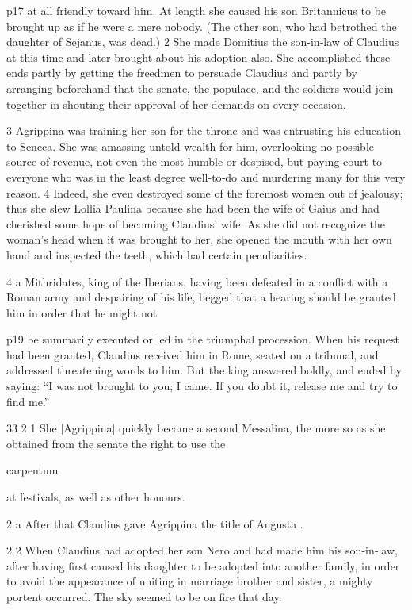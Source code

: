 p17 at all friendly toward him. At length she caused his son Britannicus to be brought up as if he were a mere nobody. (The other son, who had betrothed the daughter of Sejanus, was dead.) 2 She made Domitius the son-in\texthebrew{‑}law of Claudius at this time and later brought about his adoption also. She accomplished these ends partly by getting the freedmen to persuade Claudius and partly by arranging beforehand that the senate, the populace, and the soldiers would join together in shouting their approval of her demands on every occasion.

3
Agrippina was training her son for the throne and was entrusting his education to Seneca. She was amassing untold wealth for him, over­looking no possible source of revenue, not even the most humble or despised, but paying court to everyone who was in the least degree well-to\texthebrew{‑}do and murdering many for this very reason. 4 Indeed, she even destroyed some of the foremost women out of jealousy; thus she slew Lollia Paulina because she had been the wife of Gaius and had cherished some hope of becoming Claudius' wife. As she did not recognize the woman's head when it was brought to her, she opened the mouth with her own hand and inspected the teeth, which had certain peculiarities.

4 a
Mithridates, king of the Iberians, having been defeated in a conflict with a Roman army and despairing of his life, begged that a hearing should be granted him in order that he might not

p19 be summarily executed or led in the triumphal procession. When his request had been granted, Claudius received him in Rome, seated on a tribunal, and addressed threatening words to him. But the king answered boldly, and ended by saying: ``I was not brought to you; I came. If you doubt it, release me and try to find me.''

33
2 1 She [Agrippina] quickly became a second Messalina, the more so as she obtained from the senate the right to use the

carpentum

at festivals, as well as other honours.

2 a
After that Claudius gave Agrippina the title of Augusta .

2 2 When Claudius had adopted her son Nero and had made him his son-in\texthebrew{‑}law, after having first caused his daughter to be adopted into another family, in order to avoid the appearance of uniting in marriage brother and sister, a mighty portent occurred. The sky seemed to be on fire that day.

